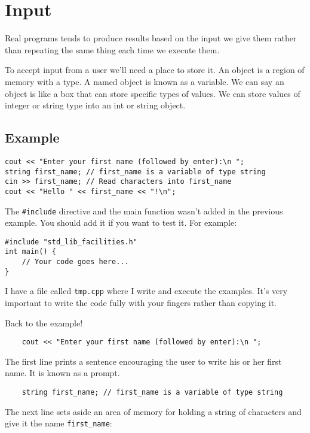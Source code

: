 \documentclass{book}
\begin{document}
\section{Input}
Real programs tends to produce results based on the input we give them rather than repeating the same thing each time we execute them.

To accept input from a user we'll need a place to store it. An object is a region of memory with a type. A named object is known as a variable. We can say an object is like a box that can store specific types of values. We can store values of integer or string type into an int or string object.

\subsection*{Example}

\begin{verbatim}
cout << "Enter your first name (followed by enter):\n ";
string first_name; // first_name is a variable of type string
cin >> first_name; // Read characters into first_name
cout << "Hello " << first_name << "!\n";
\end{verbatim}

The \verb|#include| directive and the main function wasn't added in the previous example. You should add it if you want to test it. For example:

\begin{verbatim}
#include "std_lib_facilities.h"
int main() {
	// Your code goes here...
}
\end{verbatim}

I have a file called \verb|tmp.cpp| where I write and execute the examples. It's very important to write the code fully with your fingers rather than copying it.

Back to the example!

\begin{verbatim}
	cout << "Enter your first name (followed by enter):\n ";
\end{verbatim}

The first line prints a sentence encouraging the user to write his or her first name. It is known as a prompt.

\begin{verbatim}
	string first_name; // first_name is a variable of type string
\end{verbatim}

The next line sets aside an area of memory for holding a string of characters and give it the name \verb|first_name|:
\end{document}
